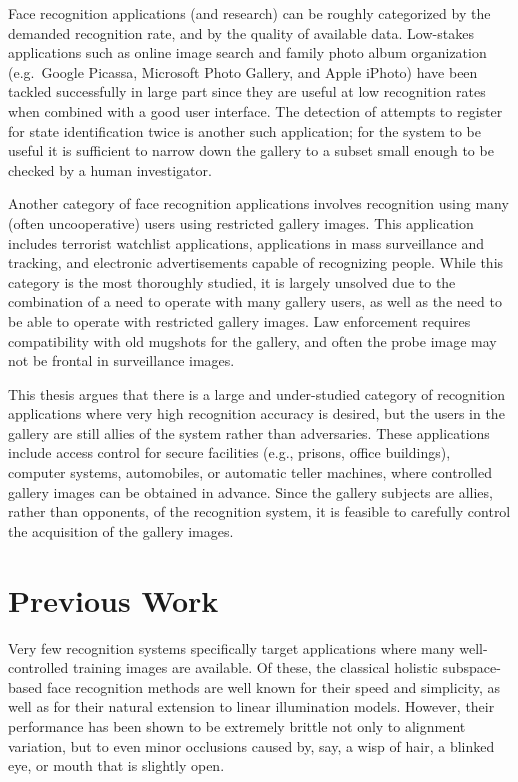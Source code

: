 Face recognition applications (and research) can be roughly categorized by the
demanded recognition rate, and by the quality of available data.  Low-stakes
applications such as online image search and family photo album organization
(e.g.\ Google Picassa, Microsoft Photo Gallery, and Apple iPhoto) have been
tackled successfully in large part since they are useful at low recognition
rates when combined with a good user interface.  The detection of attempts to register
for state identification twice is
another such application; for the system to be useful it is sufficient to narrow
down the gallery to a subset small enough to be checked by a human
investigator.

Another category of face recognition applications involves recognition using
many (often uncooperative) users using restricted gallery images.  This
application includes terrorist watchlist applications, applications in mass
surveillance and tracking, and electronic advertisements capable of recognizing
people.  While this category is the most thoroughly studied, it is largely
unsolved due to the combination of a need to operate with many gallery users,
as well as the need to be able to operate with restricted gallery images.  
Law enforcement requires compatibility with old mugshots for the gallery,
and often the probe image may not be frontal in surveillance images.

This thesis argues that there is a large and under-studied category of
recognition applications where very high recognition accuracy is desired, but
the users in the gallery are still allies of the system rather than
adversaries.  These applications include access control for secure facilities
(e.g., prisons, office buildings), computer systems, automobiles, or automatic
teller machines, where controlled gallery images can be obtained in advance.
Since the gallery subjects are allies, rather than opponents, of the
recognition system, it is feasible to carefully control the acquisition of the
gallery images. 



\section{Previous Work} Very few recognition systems specifically target
applications where many well-controlled training images are available.  Of
these, the classical holistic subspace-based face recognition methods
\cite{Turk1991-CVPR,Belhumeur1997-PAMI} are well known for their speed and
simplicity, as well as for their natural extension to linear illumination
models.  However, their performance has been shown to be extremely brittle not
only to alignment variation, but to even minor occlusions caused by, say, a
wisp of hair, a blinked eye, or mouth that is slightly open. 

